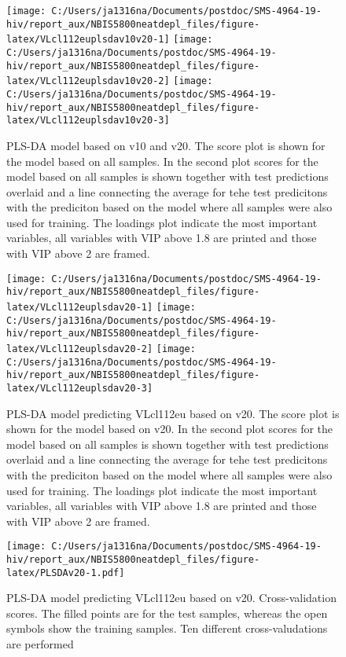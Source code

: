 \documentclass[
]{article}
\begin{document}
\begin{figure}
\texttt{[image: C:/Users/ja1316na/Documents/postdoc/SMS-4964-19-hiv/report\_aux/NBIS5800neatdepl\_files/figure-latex/VLcl112euplsdav10v20-1]} \texttt{[image: C:/Users/ja1316na/Documents/postdoc/SMS-4964-19-hiv/report\_aux/NBIS5800neatdepl\_files/figure-latex/VLcl112euplsdav10v20-2]} \texttt{[image: C:/Users/ja1316na/Documents/postdoc/SMS-4964-19-hiv/report\_aux/NBIS5800neatdepl\_files/figure-latex/VLcl112euplsdav10v20-3]} \caption{PLS-DA model based on v10 and v20. The score plot is shown for the model based on all samples. In the second plot scores for the model based on all samples is shown together with test predictions overlaid and a line connecting the average for tehe test predicitons with the prediciton based on the model where all samples were also used for training. The loadings plot indicate the most important variables, all variables with VIP above 1.8 are printed and those with VIP above 2 are framed.}\label{fig:VLcl112euplsdav10v20}
\end{figure}

\begin{figure}
\texttt{[image: C:/Users/ja1316na/Documents/postdoc/SMS-4964-19-hiv/report\_aux/NBIS5800neatdepl\_files/figure-latex/VLcl112euplsdav20-1]} \texttt{[image: C:/Users/ja1316na/Documents/postdoc/SMS-4964-19-hiv/report\_aux/NBIS5800neatdepl\_files/figure-latex/VLcl112euplsdav20-2]} \texttt{[image: C:/Users/ja1316na/Documents/postdoc/SMS-4964-19-hiv/report\_aux/NBIS5800neatdepl\_files/figure-latex/VLcl112euplsdav20-3]} \caption{PLS-DA model predicting VLcl112eu based on v20. The score plot is shown for the model based on v20. In the second plot scores for the model based on all samples is shown together with test predictions overlaid and a line connecting the average for tehe test predicitons with the prediciton based on the model where all samples were also used for training. The loadings plot indicate the most important variables, all variables with VIP above 1.8 are printed and those with VIP above 2 are framed.}\label{fig:VLcl112euplsdav20}
\end{figure}

\begin{figure}
\centering
\texttt{[image: C:/Users/ja1316na/Documents/postdoc/SMS-4964-19-hiv/report\_aux/NBIS5800neatdepl\_files/figure-latex/PLSDAv20-1.pdf]}
\caption{\label{fig:PLSDAv20}PLS-DA model predicting VLcl112eu based on v20. Cross-validation scores. The filled points are for the test samples, whereas the open symbols show the training samples. Ten different cross-valudations are performed}
\end{figure}
\end{document}

